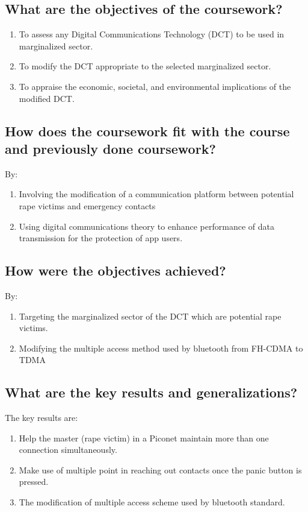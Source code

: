 \IEEEpubidadjcol %

\subsection{What are the objectives of the coursework?}
\begin{enumerate}
	\item To assess any Digital Communications Technology (DCT) to be used in marginalized sector.
	\item To modify the DCT appropriate to the selected marginalized sector.
	\item To appraise the economic, societal, and environmental implications of the modified DCT.
\end{enumerate}	

\subsection{How does the coursework fit with the course and previously done coursework?}
By:
\begin{enumerate}
	\item Involving the modification of a communication platform between potential rape victims and emergency contacts
	
	\item Using digital communications theory to enhance performance of data transmission for the protection of app users.
	
\end{enumerate}	

\subsection{How were the objectives achieved?}
By:
\begin{enumerate}
	\item Targeting the marginalized sector of the DCT which are potential rape victims.
	\item Modifying the multiple access method used by bluetooth from FH-CDMA to TDMA
	
\end{enumerate}

\subsection{What are the key results and generalizations?}
The key results are:
\begin{enumerate}
	\item Help the master (rape victim) in a Piconet maintain more than one connection simultaneously.
	\item Make use of multiple point in reaching out contacts once the panic button is pressed.
	\item The modification of multiple access scheme used by bluetooth standard.

\end{enumerate}

